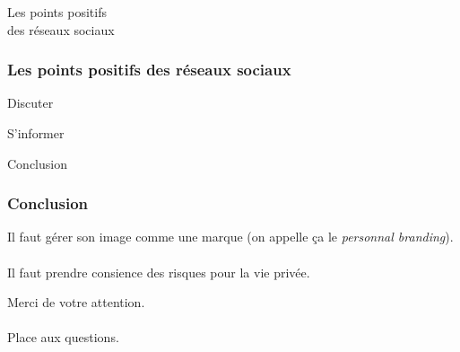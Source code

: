 \documentclass{beamer}
\begin{document}
\begin{frame}
\begin{center}
\Huge{Les points positifs \\ des réseaux sociaux}
\end{center}
\end{frame}

\begin{frame}
\frametitle{Les points positifs des réseaux sociaux}

\begin{block}{Discuter}
\end{block}

\begin{block}{S'informer}
\end{block}
\end{frame}
\begin{frame}
\begin{center}
\Huge{Conclusion}
\end{center}
\end{frame}

\begin{frame}
\frametitle{Conclusion}

Il faut gérer son image comme une marque (on appelle ça le \emph{personnal branding}).
\\~\\
Il faut prendre consience des risques pour la vie privée.

\end{frame}

\begin{frame}
\begin{center}
\Huge{Merci de votre attention. \\~\\ Place aux questions.}
\end{center}
\end{frame}
\end{document}
